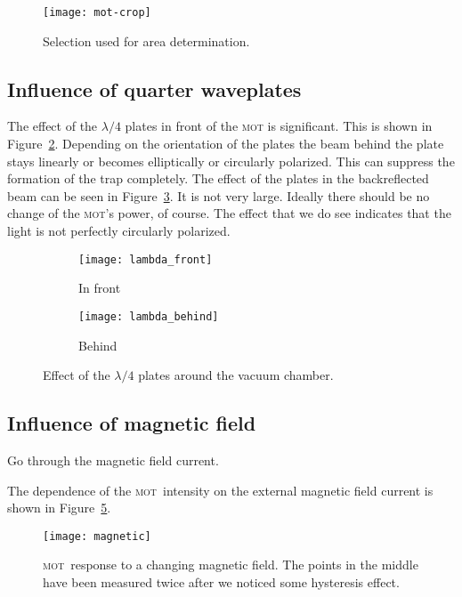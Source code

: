 \documentclass[11pt, english, fleqn, DIV=15, headinclude, BCOR=2cm]{scrreprt}
\newcommand\mot{\textsc{mot}}
\begin{document}
\begin{figure}
    \centering
    \texttt{[image: mot-crop]}
    \caption{%
        Selection used for area determination.
    }
    \label{fig:mot-crop}
\end{figure}

\subsection{Influence of quarter waveplates}

The effect of the $\lambda/4$ plates in front of the \mot{} is significant.
This is shown in Figure~\ref{fig:lambda_front}. Depending on the orientation of
the plates the beam behind the plate stays linearly or becomes elliptically or
circularly polarized. This can suppress the formation of the trap completely.
The effect of the plates in the backreflected beam can be seen in
Figure~\ref{fig:lambda_behind}. It is not very large. Ideally there should be
no change of the \mot's power, of course. The effect that we do see indicates
that the light is not perfectly circularly polarized.

\begin{figure}
    \centering
    \begin{subfigure}[c]{0.48\linewidth}
    \centering
    \texttt{[image: lambda\_front]}
    \caption{%
        In front
    }
    \label{fig:lambda_front}
    \end{subfigure}
    \hfill
    \begin{subfigure}[c]{0.48\linewidth}
    \centering
    \texttt{[image: lambda\_behind]}
    \caption{%
        Behind
    }
    \label{fig:lambda_behind}
    \end{subfigure}
    \caption{%
        Effect of the $\lambda/4$ plates around the vacuum chamber.
    }
    \label{fig:}
\end{figure}

\subsection{Influence of magnetic field}

Go through the magnetic field current.


The dependence of the \mot\ intensity on the external magnetic field current is
shown in Figure~\ref{fig:magnetic}.

\begin{figure}
    \centering
    \texttt{[image: magnetic]}
    \caption{%
        \mot\ response to a changing magnetic field. The points in the middle
        have been measured twice after we noticed some hysteresis effect.
    }
    \label{fig:magnetic}
\end{figure}
\end{document}

